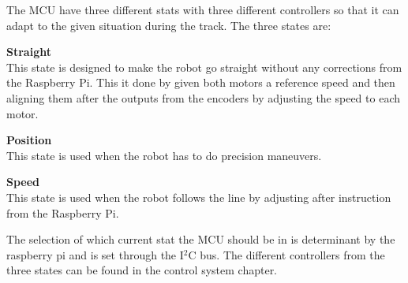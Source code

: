 The MCU have three different stats with three different controllers so that it can adapt to the given situation during the track. The three states are:

\begin{itemize}
	\begin{item}
		\textbf{Straight}\\ This state is designed to make the robot go straight without any corrections from the Raspberry Pi. This it done by given both motors a reference speed and then aligning them after the outputs from the encoders by adjusting the speed to each motor. 
	\end{item}
	
	\begin{item}
		\textbf{Position}\\This state is used when the robot has to do precision maneuvers. 
	\end{item}
	
	\begin{item}
		\textbf{Speed}\\This state is used when the robot follows the line by adjusting after instruction from the Raspberry Pi.
	\end{item}

\end{itemize}

The selection of which current stat the MCU should be in is determinant by the raspberry pi and is set through the I$^2$C bus.
The different controllers from the three states can be found in the control system chapter.    

